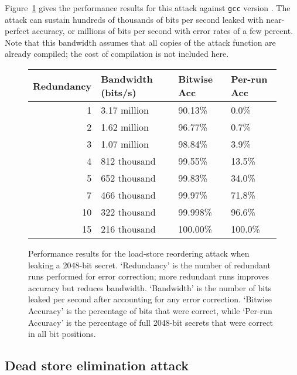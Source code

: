 Figure~\ref{fig:load-store-perf} gives the performance results for this attack
against \verb|gcc| version .
The attack can sustain hundreds of thousands of bits per second leaked with
near-perfect accuracy, or millions of bits per second with error rates of a
few percent.
Note that this bandwidth assumes that all copies of the attack function are
already compiled; the cost of compilation is not included here.

\begin{figure}
  \begin{tabular}{ r | l | l | l }
    Redundancy & Bandwidth (bits/s) & Bitwise Acc & Per-run Acc \\ \hline
    1          & 3.17 million       & 90.13\%     & 0.0\%       \\
    2          & 1.62 million       & 96.77\%     & 0.7\%       \\
    3          & 1.07 million       & 98.84\%     & 3.9\%       \\
    4          & 812 thousand       & 99.55\%     & 13.5\%      \\
    5          & 652 thousand       & 99.83\%     & 34.0\%      \\
    7          & 466 thousand       & 99.97\%     & 71.8\%      \\
    10         & 322 thousand       & 99.998\%    & 96.6\%      \\
    15         & 216 thousand       & 100.00\%    & 100.0\%     \\
  \end{tabular}
  \caption{
    Performance results for the load-store reordering attack when leaking a
    2048-bit secret.
    `Redundancy' is the number of redundant runs performed for error
    correction; more redundant runs improves accuracy but reduces bandwidth.
    `Bandwidth' is the number of bits leaked per second after accounting for
    any error correction.
    `Bitwise Accuracy' is the percentage of bits that were correct, while
    `Per-run Accuracy' is the percentage of full 2048-bit secrets that were
    correct in all bit positions.
  }
  \label{fig:load-store-perf}
\end{figure}

\subsection{Dead store elimination attack}
\label{subsec:exp-dse}

